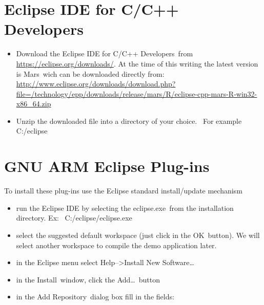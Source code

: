 \hypertarget{h.tyjcwt}{\section{\texorpdfstring{{Eclipse IDE for C/C++
Developers}}{Eclipse IDE for C/C++ Developers}}\label{h.tyjcwt}}

\begin{itemize}
\tightlist
\item
  {Download the }{Eclipse IDE for C/C++ Developers}{~from
  }{\href{https://www.google.com/url?q=https://eclipse.org/downloads/\&sa=D\&ust=1511275046374000\&usg=AFQjCNGku66E543IPyqaPfqFKQo3pd2L3A}{https://eclipse.org/downloads/}}{.
  At the time of this writing the latest version is }{Mars}{~wich can be
  downloaded directly from:
  }{\href{https://www.google.com/url?q=http://www.eclipse.org/downloads/download.php?file\%3D/technology/epp/downloads/release/mars/R/eclipse-cpp-mars-R-win32-x86_64.zip\&sa=D\&ust=1511275046375000\&usg=AFQjCNGpm_xGDGG0CV-OUsVfXgLuVmq5zw}{http://www.eclipse.org/downloads/download.php?file=/technology/epp/downloads/release/mars/R/eclipse-cpp-mars-R-win32-x86\_64.zip}}
\item
  {Unzip the downloaded file into a directory of your choice. ~For
  example }{C:/eclipse}
\end{itemize}

\hypertarget{h.3dy6vkm}{\section{\texorpdfstring{{GNU ARM Eclipse
Plug-ins}}{GNU ARM Eclipse Plug-ins}}\label{h.3dy6vkm}}

{To install these plug-ins use the Eclipse standard install/update
mechanism}

\begin{itemize}
\tightlist
\item
  {run the Eclipse IDE by selecting the }{eclipse.exe}{~from the
  installation directory. Ex: ~}{C:/eclipse/eclipse.exe}
\item
  {select the suggested default workspace (just click in the
  }{OK}{~button). We will select another workspace to compile the demo
  application later.}
\item
  {in the Eclipse menu select }{Help--\textgreater{}Install New
  Software\ldots{}}
\item
  {in the }{Install}{~window, click the }{Add\ldots{}}{~button}
\item
  {in the }{Add Repository}{~dialog box fill in the fields:}
\end{itemize}

